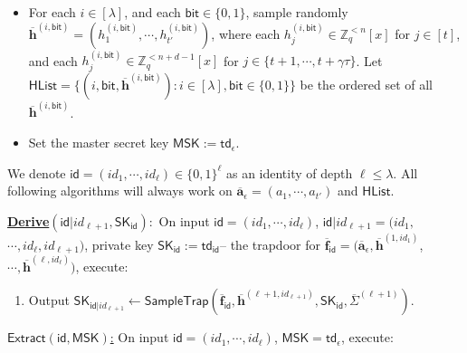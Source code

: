 \documentclass[runningheads]{llncs}
\begin{document}
\begin{description}
\begin{itemize}
\item For each $i\in [\lambda]$, and each $\mathsf{bit}\in\{0,1\}$, sample randomly $\overline{\mathbf{h}}^{(i,\mathsf{bit})}=(h_1^{(i,\mathsf{bit})}, \cdots,h_{t'}^{(i,\mathsf{bit})} )$, where each $h_{j}^{(i,\mathsf{bit})}\in \mathbb{Z}_q^{<n}[x]$ for $j\in [t]$, and each $h_{j}^{(i,\mathsf{bit})}\in \mathbb{Z}_q^{<n+d-1}[x]$  for $j\in \{t+1, \cdots, t+\gamma\tau\}$. Let $\textsf{HList}=\{(i,\textsf{bit}, \overline{\mathbf{h}}^{(i,\mathsf{bit})}): i \in [\lambda], \textsf{bit}\in \{0,1\} \}$ be the ordered set of all $\overline{\mathbf{h}}^{(i,\mathsf{bit})}$. 

\item Set the master secret key $\mathsf{MSK}:=\mathsf{td}_\epsilon$. 
\end{itemize}

We denote $\textsf{id}=(id_1, \cdots, id_\ell) \in \{0,1\}^\ell$ as an identity of depth $\ell \leq \lambda$. All following algorithms will always work on $\overline{\mathbf{a}}_{\epsilon}=(a_1,\cdots,a_{t'})$ and $\textsf{HList}$.

\item \underline{\textbf{\textsf{Derive}}$( \mathsf{id}|id_{\ell+1},\mathsf{SK}_{\textsf{id}}):$} On input  $\mathsf{id}=(id_1, \cdots, id_\ell)$, $\mathsf{id}|id_{\ell+1}=(id_1,$ $ \cdots, id_\ell, id_{\ell+1})$,  private key  $\mathsf{SK}_\mathsf{id}:=\textsf{td}_{\textsf{id}}$-- the trapdoor for $\overline{\mathbf{f}}_{\mathsf{id}}=(\overline{\mathbf{a}}_{\epsilon}, \overline{\mathbf{h}}^{(1,id_1)}$, $  \cdots,\overline{\mathbf{h}}^{(\ell,id_{\ell})})$, execute: 
\begin{enumerate}
\item Output $\mathsf{SK}_{\mathsf{id}|id_{\ell+1}} \leftarrow \mathsf{SampleTrap}(\overline{\mathbf{f}}_{\mathsf{id}},\overline{\mathbf{h}}^{(\ell+1,id_{\ell+1})},\mathsf{SK}_\mathsf{id},\overline{\Sigma}^{(\ell +1)})$.
\end{enumerate}



\item \underline{ \textbf{$\textsf{Extract}(\mathsf{id},\mathsf{MSK})$}:} On input   $\mathsf{id}=(id_1, \cdots, id_\ell)$,  $\mathsf{MSK}=\mathsf{td}_\epsilon$, execute:


\end{description}
\end{document}
